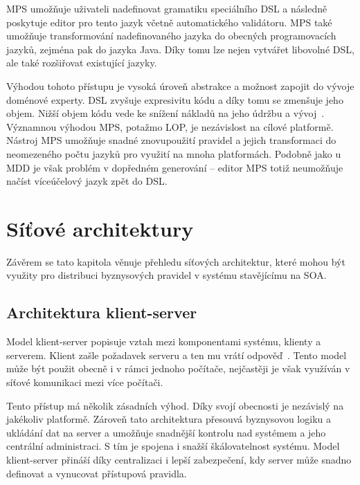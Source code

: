 MPS umožňuje uživateli nadefinovat gramatiku speciálního \gls{DSL} a následně poskytuje
editor pro tento jazyk včetně automatického validátoru. MPS také umožňuje transformování
nadefinovaného jazyka do obecných programovacích jazyků, zejména pak do jazyka Java.
Díky tomu lze nejen vytvářet libovolné \gls{DSL}, ale také rozšiřovat existující jazyky.

Výhodou tohoto přístupu je vysoká úroveň abstrakce a možnost zapojit do vývoje doménové experty.
\gls{DSL} zvyšuje expresivitu kódu a díky tomu se zmenšuje jeho objem.
Nižší objem kódu vede ke snížení nákladů na jeho údržbu a vývoj~\cite{littman1987mental, soloway1986empirical}.
Významnou výhodou MPS, potažmo \gls{LOP}, je nezávislost na cílové platformě.
Nástroj MPS umožňuje snadné znovupoužití pravidel a jejich transformaci do neomezeného počtu jazyků pro
využití na mnoha platformách. Podobně jako u \gls{MDD} je však problém v dopředném
generování -- editor MPS totiž neumožňuje načíst víceúčelový jazyk zpět do \gls{DSL}.

\section{Síťové architektury}

Závěrem se tato kapitola věnuje přehledu síťových architektur, které mohou být využity pro
distribuci byznysových pravidel v systému stavějícímu na \gls{SOA}.

\subsection{Architektura klient-server}\label{sec:client-server}

Model klient-server popisuje vztah mezi komponentami systému, klienty a serverem.
Klient zašle požadavek serveru a ten mu vrátí odpověď~\cite{berson1992client}.
Tento model může být použit obecně i v rámci jednoho počítače,
nejčastěji je však využíván v síťové komunikaci mezi více počítači.

Tento přístup má několik zásadních výhod. Díky svojí obecnosti je nezávislý
na jakékoliv platformě. Zároveň tato architektura přesouvá byznysovou logiku a
ukládání dat na server a umožňuje snadnější kontrolu nad systémem a jeho centrální
administraci. S tím je spojena i snažší škálovatelnost systému. Model klient-server
přináší díky centralizaci i lepší zabezpečení, kdy server může snadno definovat a
vynucovat přístupová pravidla.

